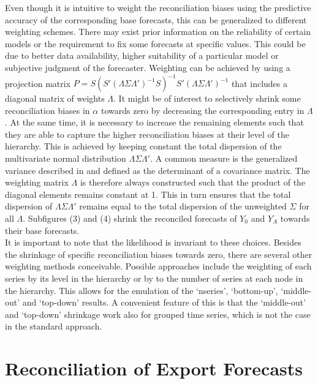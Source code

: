 \documentclass[a4paper,fleqn,11pt]{article}
\begin{document}
Even though it is intuitive to weight the reconciliation biases using the predictive accuracy of the corresponding base forecasts, this can be generalized to different weighting schemes. There may exist prior information on the reliability of certain models or the requirement to fix some forecasts at specific values. This could be due to better data availability, higher suitability of a particular model or subjective judgment of the forecaster. Weighting can be achieved by using a projection matrix $P= S(S'(\Lambda\Sigma\Lambda')^{-1}S)^{-1}S'(\Lambda\Sigma\Lambda')^{-1}$ that includes a diagonal matrix of weights $\Lambda$. It might be of interest to selectively shrink some reconciliation biases in $\alpha$ towards zero by decreasing the corresponding entry in $\Lambda$. At the same time, it is necessary to increase the remaining elements such that they are able to capture the higher reconciliation biases at their level of the hierarchy. This is achieved by keeping constant the total dispersion of the  multivariate normal distribution $\Lambda\Sigma\Lambda'$. A common measure is the generalized variance described in \cite{Mustonen1997} and defined as the determinant of a covariance matrix. The weighting matrix $\Lambda$ is therefore always constructed such that the product of the diagonal elements remains constant at 1. This in turn ensures that the total dispersion of $\Lambda\Sigma\Lambda'$ remains equal to the total dispersion of the unweighted $\Sigma$ for all $\Lambda$. Subfigures (3) and (4) shrink the reconciled forecasts of $Y_0$ and $Y_A$ towards their base forecasts.\\

It is important to note that the likelihood is invariant to these choices. Besides the shrinkage of specific reconciliation biases towards zero, there are several other weighting methods conceivable.  Possible approaches include the weighting of each series by its level in the hierarchy or by to the number of series at each node in the hierarchy. This allows for the emulation of the `nseries', `bottom-up', `middle-out' and `top-down' results. A convenient feature of this is that the `middle-out' and `top-down' shrinkage work also for grouped time series, which is not the case in the standard approach. \\

\clearpage


\section{Reconciliation of Export Forecasts}
\label{sec:appl}
\end{document}
